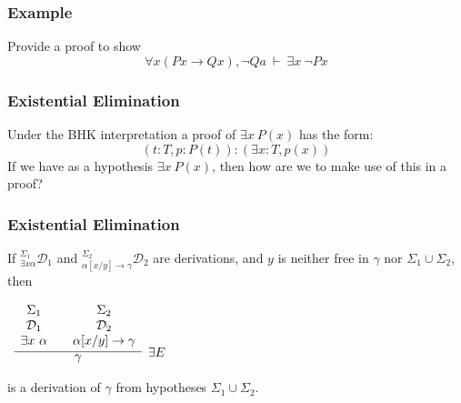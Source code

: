 \documentclass{beamer}
\theoremstyle{indentDefn} \newtheorem{defn}[]{Definition}
\begin{document}
\begin{frame}
	\frametitle{Example}
	
	Provide a proof to show $$\forall x (Px \rightarrow Qx), \lnot Qa \ \vdash \ \exists x \ \lnot Px$$
	
	\vspace{60mm}	
\end{frame}

\begin{frame}
	\frametitle{Existential Elimination}

	Under the BHK interpretation a proof of $\exists x \ P(x)$ has the form: 
	$$(t : T, p : P(t)) : (\exists x : T, p(x))$$
	If we have as a hypothesis $\exists x \ P(x)$, then how are we to make use of this in a proof? 

	\vspace{50mm}


\end{frame}

\begin{frame}
	\frametitle{Existential Elimination}
	
	If $^{\Sigma_{1}}_{\exists x \alpha}\mathcal{D}_{1}$ and $^{\Sigma_{2}}_{\alpha[x/y]\rightarrow\gamma}\mathcal{D}_{2}$ are derivations, and $y$ is neither free in $\gamma$ nor $\Sigma_{1} \cup \Sigma_{2
	}$, then
	
	\begin{center}
	$\begin{array}{ c }
	
	\infer[\exists E]{\gamma}
	{
		\begin{array}{c} \Sigma_{1}  \\ \mathcal{D}_{1} \\ \exists x \ \alpha \end{array}
		& 
		\begin{array}{c} \Sigma_{2}  \\ \mathcal{D}_{2} \\ \alpha[x/y]\rightarrow\gamma \end{array}				
	}	
	
	\end{array}$
	\end{center}

	is a derivation of $\gamma$ from hypotheses $\Sigma_{1} \cup \Sigma_{2}$. 
	
	
\end{frame}
\end{document}
